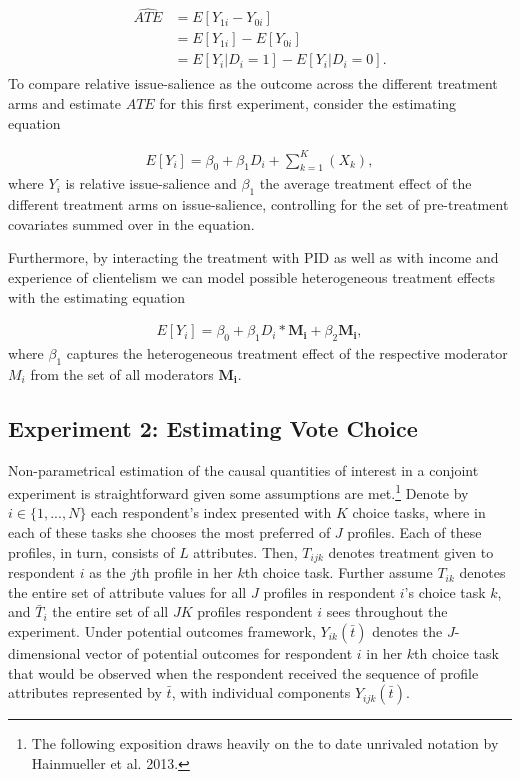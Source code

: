 \documentclass[11pt]{article}
\begin{document}
\begin{align}
\begin{split}
\widehat{ATE} & = E[Y_{1i} - Y_{0i}] \\
& = E[Y_{1i}] - E[Y_{0i}] \\
& = E[Y_i|D_i = 1] - E[Y_i|D_i = 0].
\end{split}
\end{align}
To compare relative issue-salience as the outcome across the different treatment arms and estimate $ATE$ for this first experiment, consider the estimating equation

\begin{align}
E[Y_i] = \beta_0 + \beta_1D_i + \sum_{k=1}^{K}(X_k),
\end{align}
where $Y_i$ is relative issue-salience and $\beta_1$ the average treatment effect of the different treatment arms on issue-salience, controlling for the set of pre-treatment covariates summed over in the equation.

Furthermore, by interacting the treatment with PID as well as with income and experience of clientelism we can model possible heterogeneous treatment effects with the estimating equation

\begin{align}
E[Y_i] = \beta_0 + \beta_1D_i * \bm{M_i} + \beta_2 \bm{M_i},
\end{align}
where $\beta_1$ captures the heterogeneous treatment effect of the respective moderator $M_i$ from the set of all moderators $\bm{M_i}$.

\subsection{Experiment 2: Estimating Vote Choice}
Non-parametrical estimation of the causal quantities of interest in a conjoint experiment is straightforward given some assumptions are met.\footnote{The following exposition draws heavily on the to date unrivaled notation by Hainmueller et al. 2013.} Denote by $i \in \{1,...,N\}$ each respondent's index presented with $K$ choice tasks, where in each of these tasks she chooses the most preferred of $J$ profiles. Each of these profiles, in turn, consists of $L$ attributes. Then, $T_{ijk}$ denotes treatment given to respondent $i$ as the $j$th profile in her $k$th choice task. Further assume $T_{ik}$ denotes the entire set of attribute values for all $J$ profiles in respondent $i$'s choice task $k$, and $\bar{T}_i$ the entire set of all $JK$ profiles respondent $i$ sees throughout the experiment. Under potential outcomes framework, $Y_{ik}(\bar{t})$ denotes the $J$-dimensional vector of potential outcomes for respondent $i$ in her $k$th choice task that would be observed when the respondent received the sequence of profile attributes represented by $\bar{t}$, with individual components $Y_{ijk}(\bar{t})$.
\end{document}
